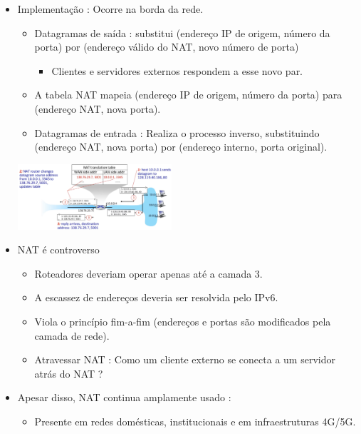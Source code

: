\begin{itemize}[left=0.5cm, align=left, nosep]
                \item Implementação : Ocorre na borda da rede.
                \begin{itemize}[left=0.5cm, nosep, label=$\hookrightarrow$]
                    \item Datagramas de saída : substitui (endereço IP de origem, número da porta) por (endereço válido do NAT, novo número de porta)
                        \begin{itemize}[left=0.5cm, nosep, label=$-$]
                            \item Clientes e servidores externos respondem a esse novo par.
                        \end{itemize}
                    \item A tabela NAT mapeia (endereço IP de origem, número da porta) para (endereço NAT, nova porta). 
                    \item Datagramas de entrada : Realiza o processo inverso, substituindo (endereço NAT, nova porta) por (endereço interno, porta original).  
                \end{itemize}

                \begin{center}
                    \includegraphics[width=0.45\textwidth]{img/cap-04/nat2.png}
                \end{center}

                \item NAT é controverso
                \begin{itemize}[left=0.5cm, nosep, label=$\hookrightarrow$]
                    \item Roteadores deveriam operar apenas até a camada 3.
                    \item A escassez de endereços deveria ser resolvida pelo IPv6.
                    \item Viola o princípio fim-a-fim (endereços e portas são modificados pela camada de rede).
                    \item Atravessar NAT : Como um cliente externo se conecta a um servidor atrás do NAT ?
                \end{itemize}    

                \item Apesar disso, NAT continua amplamente usado :
                \begin{itemize}[left=0.5cm, nosep, label=$\hookrightarrow$]
                    \item Presente em redes domésticas, institucionais e em infraestruturas 4G/5G.
                \end{itemize}  
            
            \end{itemize}

